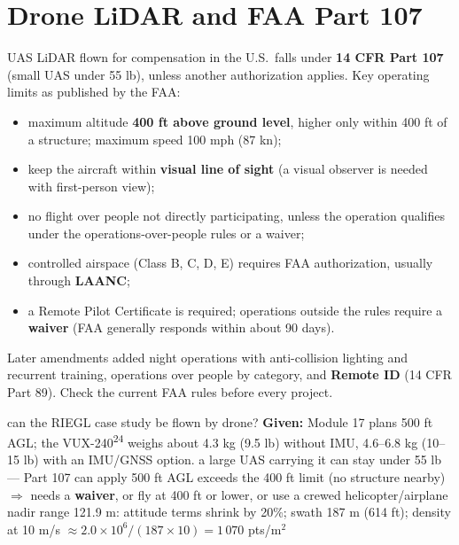 \section{Drone LiDAR and FAA Part 107}
\begin{eng}
UAS LiDAR flown for compensation in the U.S.\ falls under \textbf{14 CFR Part 107} (small UAS under 55 lb), unless another authorization applies. Key operating limits as published by the FAA:
\begin{itemize}
\item maximum altitude \textbf{400 ft above ground level}, higher only within 400 ft of a structure; maximum speed 100 mph (87 kn);
\item keep the aircraft within \textbf{visual line of sight} (a visual observer is needed with first-person view);
\item no flight over people not directly participating, unless the operation qualifies under the operations-over-people rules or a waiver;
\item controlled airspace (Class B, C, D, E) requires FAA authorization, usually through \textbf{LAANC};
\item a Remote Pilot Certificate is required; operations outside the rules require a \textbf{waiver} (FAA generally responds within about 90 days).
\end{itemize}
Later amendments added night operations with anti-collision lighting and recurrent training, operations over people by category, and \textbf{Remote ID} (14 CFR Part 89). Check the current FAA rules before every project.
\end{eng}

\begin{worked}{can the RIEGL case study be flown by drone?}
\textbf{Given:} Module 17 plans 500 ft AGL; the VUX-240\textsuperscript{24} weighs about 4.3 kg (9.5 lb) without IMU, 4.6--6.8 kg (10--15 lb) with an IMU/GNSS option.
 a large UAS carrying it can stay under 55 lb --- Part 107 can apply
 500 ft AGL exceeds the 400 ft limit (no structure nearby) $\Rightarrow$ needs a \textbf{waiver}, or fly at 400 ft or lower, or use a crewed helicopter/airplane
 nadir range 121.9 m: attitude terms shrink by 20\%; swath 187 m (614 ft); density at 10 m/s $\approx2.0\times10^6/(187\times10)=1\,070$ pts/m$^2$
\end{worked}

